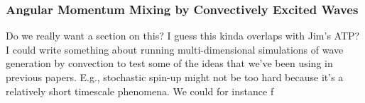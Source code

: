 {\color{purple}
\subsubsection{Angular Momentum Mixing by Convectively Excited Waves}}

Do we really want a section on this?  I guess this kinda overlaps with Jim's ATP?  I could write something about running multi-dimensional simulations of wave generation by convection to test some of the ideas that we've been using in previous papers.  E.g., stochastic spin-up might not be too hard because it's a relatively short timescale phenomena. We could for instance f

